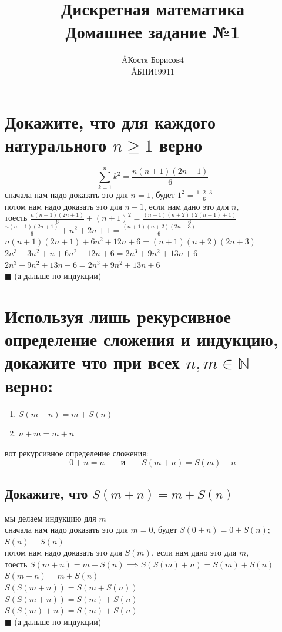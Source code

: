 \documentclass{article}
\title{Дискретная математика \\ Домашнее задание №1}
\author{\AA{Костя Борисов}{4} \\ \AA{БПИ199}{11}}
\newcommand{\ds}{\displaystyle}
\begin{document}
  \maketitle

  \section{Докажите, что для каждого натурального $n \geq 1$ верно}
  $$\sum_{k=1}^n k^2 = \frac{n(n+1)(2n+1)}{6}$$
  сначала нам надо доказать это для $n=1$, будет $\ds 1^2 = \frac{1 \cdot 2 \cdot 3}{6}$ \\
  потом нам надо доказать это для $n+1$, если нам дано это для $n$, \\
  тоесть $\ds \frac{n(n+1)(2n+1)}{6} + (n+1)^2 = \frac{(n+1)(n+2)(2(n+1)+1)}{6}$ \\
  $\ds \frac{n(n+1)(2n+1)}{6} + n^2 + 2n + 1 = \frac{(n+1)(n+2)(2n+3)}{6}$ \\
  $\ds n(n+1)(2n+1) + 6n^2 + 12n + 6 = (n+1)(n+2)(2n+3)$ \\
  $\ds 2n^3 + 3n^2 + n + 6n^2 + 12n + 6 = 2n^3 + 9n^2 + 13n + 6$ \\
  $\ds 2n^3 + 9n^2 + 13n + 6 = 2n^3 + 9n^2 + 13n + 6$ \\
  $\blacksquare$ (а дальше по индукции)

  \section{Используя лишь рекурсивное определение сложения и индукцию, докажите что при всех $n, m \in \mathbb{N}$ верно:}
  \begin{center}
    \begin{varwidth}{\textwidth}
      \begin{enumerate}
        \item $S(m+n) = m+S(n)$
        \item $n+m = m+n$
      \end{enumerate}
    \end{varwidth}
  \end{center}
  вот рекурсивное определение сложения:
  $$ 0+n=n \qquad \textrm{и} \qquad S(m+n) = S(m)+n $$
  \subsection{Докажите, что $S(m+n) = m+S(n)$}
  \label{recsymetry}
  мы делаем индукцию для $m$ \\
  сначала нам надо доказать это для $m=0$, будет $ S(0+n) = 0+S(n) $; $S(n)=S(n)$ \\
  потом нам надо доказать это для $S(m)$, если нам дано это для $m$, \\
  тоесть $ S(m+n) = m+S(n) \implies S(S(m)+n) = S(m)+S(n) $ \\
  $ S(m+n) = m+S(n) $ \\
  $ S(S(m+n)) = S(m+S(n)) $ \\
  $ S(S(m+n)) = S(m)+S(n) $ \\
  $ S(S(m)+n) = S(m)+S(n) $ \\
  $\blacksquare$ (а дальше по индукции)
\end{document}
